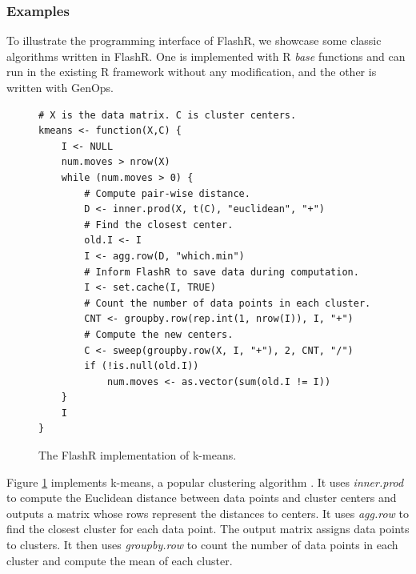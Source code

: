 \subsubsection{Examples} \label{sec:apps}
To illustrate the programming interface of FlashR, we showcase some classic
algorithms written in FlashR. One is implemented with R \textit{base} functions
and can run in the existing R framework without any modification, and the other
is written with GenOps.

\begin{figure}
\centering
\begin{verbatim}
# X is the data matrix. C is cluster centers.
kmeans <- function(X,C) {
	I <- NULL
	num.moves > nrow(X)
	while (num.moves > 0) {
		# Compute pair-wise distance.
		D <- inner.prod(X, t(C), "euclidean", "+")
		# Find the closest center.
		old.I <- I
		I <- agg.row(D, "which.min")
		# Inform FlashR to save data during computation.
		I <- set.cache(I, TRUE)
		# Count the number of data points in each cluster.
		CNT <- groupby.row(rep.int(1, nrow(I)), I, "+")
		# Compute the new centers.
		C <- sweep(groupby.row(X, I, "+"), 2, CNT, "/")
		if (!is.null(old.I))
			num.moves <- as.vector(sum(old.I != I))
	}
	I
}
\end{verbatim}
\vspace{-10pt}
	\caption{The FlashR implementation of k-means.}
	\label{fig:kmeans}
\vspace{-10pt}
\end{figure}

Figure \ref{fig:kmeans} implements k-means, a popular clustering algorithm
\cite{kmeans}. It uses \textit{inner.prod} to
compute the Euclidean distance between data points and cluster centers
and outputs a matrix whose rows represent the distances to centers.  
It uses \textit{agg.row} to find the closest cluster for each data point.
The output matrix 
assigns data points to clusters. It then uses \textit{groupby.row} to count
the number of data points in each cluster and compute the mean of each cluster.

